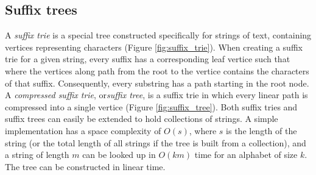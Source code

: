 \documentclass[thesis.tex]{subfiles}
\begin{document}
\subsection{Suffix trees}
A \textit{suffix trie} is a special tree constructed specifically for strings of text, containing vertices representing characters (Figure \ref{fig:suffix_trie}). When creating a suffix trie for a given string, every suffix has a corresponding leaf vertice such that where the vertices along path from the root to the vertice contains the characters of that suffix. Consequently, every substring has a path starting in the root node. A \textit{compressed suffix trie}, or\textit{suffix tree}, is a suffix trie in which every linear path is compressed into a single vertice (Figure \ref{fig:suffix_tree}). Both suffix tries and suffix trees can easily be extended to hold collections of strings\cite[Chapter 20]{algorithms_sequential_parallell_and_distributed}. A simple implementation has a space complexity of $O(s)$, where $s$ is the length of the string (or the total length of all strings if the tree is built from a collection), and a string of length $m$ can be looked up in $O(km)$ time for an alphabet of size $k$\cite[Section 20.6.1]{algorithms_sequential_parallell_and_distributed}. The tree can be constructed in linear time\cite{online_construction_of_suffix_trees}.
\par\noindent
\end{document}
